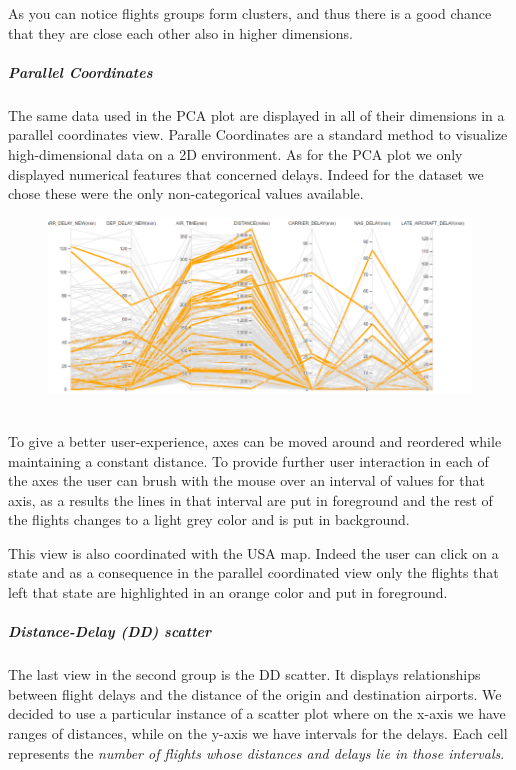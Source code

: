 \documentclass[a4paper, 12pt]{article}
\begin{document}
As you can notice flights groups form clusters, and thus there is a good chance that
they are close each other also in higher dimensions.
\clearpage

\subparagraph{Parallel Coordinates}
The same data used in the PCA plot are displayed in all of their dimensions in a parallel coordinates
view. Paralle Coordinates are a standard method to visualize high-dimensional data on a 2D environment. 
As for the PCA plot we only displayed numerical features that concerned delays. Indeed for the dataset we
chose these were the only non-categorical values available.
\\
\begin{figure}[h]	
\centering
\includegraphics[scale=0.7]{pc.PNG}
\end{figure}
\\
To give a better user-experience, axes can be moved around and reordered while maintaining a constant 
distance. To provide further user interaction in each of the axes the user can brush with the mouse over
an interval of values for that axis, as a results the lines in that interval are put in foreground and
the rest of the flights changes to a light grey color and is put in background.

This view is also coordinated with the USA map. Indeed the user can click on a state and as a 
consequence in the parallel coordinated view only the flights that left that state are highlighted in an
orange color and put in foreground.

\subparagraph{Distance-Delay (DD) scatter} 
The last view in the second group is the DD scatter. It displays relationships between flight delays and
the distance of the origin and destination airports.
We decided to use a particular instance of a scatter plot where on the x-axis we have ranges of 
distances, while on the y-axis we have intervals for the delays. Each cell represents the 
\textit{number of flights whose distances and delays lie in those intervals}.
\end{document}
